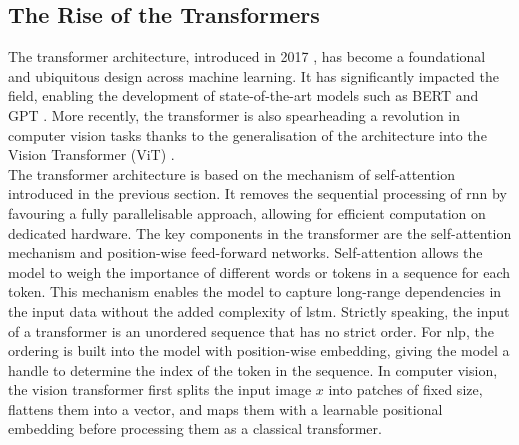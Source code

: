 \subsection{The Rise of the Transformers}\label{sec:transformer}
The transformer architecture, introduced in 2017 \cite{NIPS_transformerPaper}, has become a foundational and ubiquitous design across machine learning. It has significantly impacted the field, enabling the development of state-of-the-art models such as BERT \cite{devlin-etal-2019-bert} and GPT \cite{radford2018improving}. More recently, the transformer is also spearheading a revolution in computer vision tasks thanks to the generalisation of the architecture into the Vision Transformer (ViT) \cite{vitPaper}.\\

The transformer architecture is based on the mechanism of self-attention introduced in the previous section. It removes the sequential processing of \gls{rnn} by favouring a fully parallelisable approach, allowing for efficient computation on dedicated hardware. The key components in the transformer are the self-attention mechanism and position-wise feed-forward networks. Self-attention allows the model to weigh the importance of different words or tokens in a sequence for each token. This mechanism enables the model to capture long-range dependencies in the input data without the added complexity of \gls{lstm}. Strictly speaking, the input of a transformer is an unordered sequence that has no strict order. For \gls{nlp}, the ordering is built into the model with position-wise embedding, giving the model a handle to determine the index of the token in the sequence. In computer vision, the vision transformer first splits the input image $x$ into patches of fixed size, flattens them into a vector, and maps them with a learnable positional embedding before processing them as a classical transformer.

